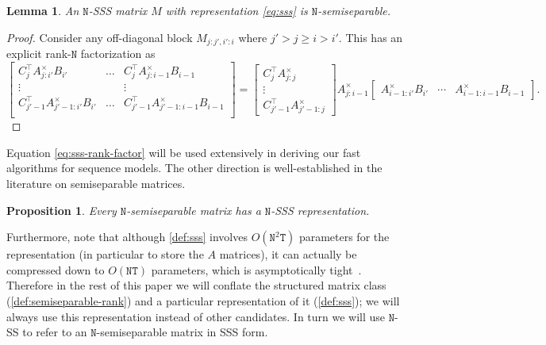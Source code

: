 \documentclass{article}
\newcommand{\citep}{\parencite}
\newtheorem{lemma}[theorem]{Lemma}
\newtheorem{proposition}[theorem]{Proposition}
\begin{document}
\begin{lemma}
  \label{lmm:sss-rank-factor}
  An $\mathtt{N}$-SSS matrix $M$ with representation \eqref{eq:sss} is $\mathtt{N}$-semiseparable.
\end{lemma}
\begin{proof}
  Consider any off-diagonal block $M_{j:j', i':i}$ where $j' > j \ge i > i'$.
  This has an explicit rank-$\mathtt{N}$ factorization as
  \begin{equation}
    \label{eq:sss-rank-factor}
    \begin{bmatrix}
      C_j^{\top} A_{j:i'}^\times B_{i'}         & \dots & C_j^{\top} A_{j:i-1}^\times B_{i-1}   \\
      \vdots                                    &       &       \vdots      \\
      C_{j'-1}^{\top} A_{j'-1:i'}^\times B_{i'} & \dots & C_{j'-1}^{\top} A_{j'-1:i-1}^\times B_{i-1} \\
    \end{bmatrix}
    =
    \begin{bmatrix} C_j^{\top} A_{j:j}^\times \\ \vdots \\ C_{j'-1}^{\top} A_{j'-1:j}^\times \end{bmatrix}
    A_{j:i-1}^\times
    \begin{bmatrix} A_{i-1:i'}^\times B_{i'} & \cdots & A_{i-1:i-1}^\times B_{i-1} \end{bmatrix}
    .
  \end{equation}
\end{proof}
Equation \eqref{eq:sss-rank-factor} will be used extensively in deriving our fast algorithms for sequence models.
The other direction is well-established in the literature on semiseparable matrices.

\begin{proposition}
  \label{prop:sss}
  Every $\mathtt{N}$-semiseparable matrix has a $\mathtt{N}$-SSS representation.
\end{proposition}
Furthermore, note that although \cref{def:sss} involves $O(\mathtt{N}^2\mathtt{T})$ parameters for the representation (in particular to store the $A$ matrices),
it can actually be compressed down to $O(\mathtt{NT})$ parameters, which is asymptotically tight~\citep{pernet2023exact}.
Therefore in the rest of this paper we will conflate the structured matrix class (\cref{def:semiseparable-rank}) and a particular representation of it (\cref{def:sss}); we will always use this representation instead of other candidates.
In turn we will use $\mathtt{N}$-SS to refer to an $\mathtt{N}$-semiseparable matrix in SSS form.
\end{document}
